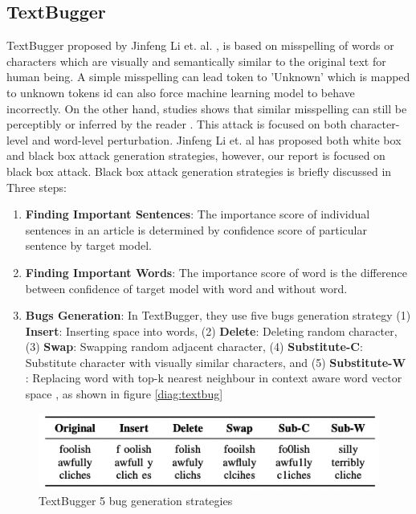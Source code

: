 \documentclass[%
	BCOR=8mm, %
	DIV=12, 
	toc=bibliography, %
	toc=listof, %
	oneside, %
	egregdoesnotlikesansseriftitles, %
	]{scrbook}
\begin{document}
\subsection{TextBugger}

TextBugger  proposed by Jinfeng Li et$.$ al$.$ \cite{li_textbugger_2019}, is based on misspelling of words or characters which are visually and semantically similar to the original text 
for human being. A simple misspelling can lead token to 'Unknown'  which is mapped to unknown tokens id can also force machine learning model to behave incorrectly. On the other 
hand, studies shows that similar misspelling can still be perceptibly or inferred by the reader \cite{rawlinson_significance_2007,alzantot_generating_2018}  . This attack is focused on 
both character-level and word-level perturbation. Jinfeng Li et. al has proposed both white box and black box attack generation strategies, however, our report is focused on black box 
attack. Black box attack generation strategies is briefly discussed in Three steps:

\begin{enumerate}
\item \textbf{Finding Important Sentences}: The importance score of individual sentences in an article is determined by confidence score of particular sentence by target model. 
\item \textbf{Finding Important Words}: The importance score of word is the difference between confidence of target model with word and without word. 
\item \textbf{Bugs Generation}: In TextBugger, they use five bugs generation strategy (1) \textbf{Insert}: Inserting space into words, (2) \textbf{Delete}: Deleting random character, 
(3) \textbf{Swap}: Swapping random adjacent character, (4) \textbf{Substitute-C}: Substitute character with visually similar characters, and (5)\textbf{ Substitute-W} : Replacing word 
with top-k nearest neighbour in context aware word vector space , as shown in figure \ref{diag:textbug} 
\end{enumerate}

\begin{figure}[h!]
\centering
\includegraphics[width=.8\textwidth]{img/textbugger_5strat.png}
\caption{TextBugger 5 bug generation strategies \cite{li_textbugger_2019} }
\label{diag:textbug5}
\end{figure}
\end{document}
